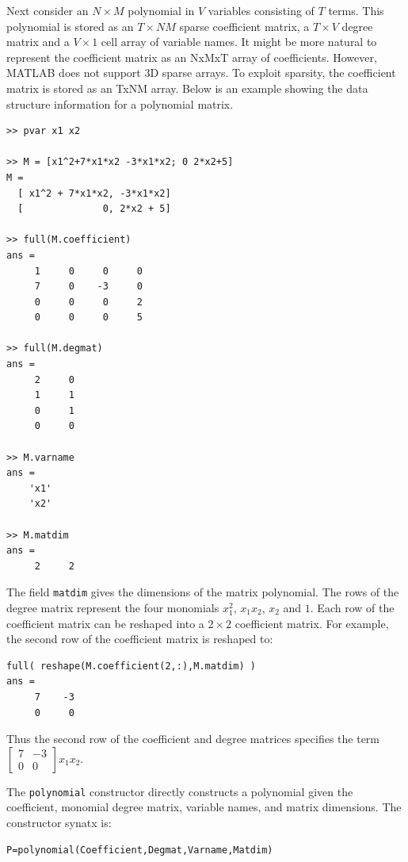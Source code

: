 \documentclass{article}
\newcommand{\bsmtx}{\left[ \begin{smallmatrix}}
\newcommand{\esmtx}{\end{smallmatrix} \right]}
\begin{document}
Next consider an $N\times M$ polynomial in $V$ variables consisting of
$T$ terms. This polynomial is stored as an $T\times NM$ sparse
coefficient matrix, a $T \times V$ degree matrix and a $V\times 1$
cell array of variable names. It might be more natural to represent
the coefficient matrix as an NxMxT array of coefficients. However,
MATLAB does not support 3D sparse arrays. To exploit sparsity, the
coefficient matrix is stored as an TxNM array. Below is an example
showing the data structure information for a polynomial matrix.

\begin{verbatim}
>> pvar x1 x2

>> M = [x1^2+7*x1*x2 -3*x1*x2; 0 2*x2+5]
M =
  [ x1^2 + 7*x1*x2, -3*x1*x2]
  [              0, 2*x2 + 5]

>> full(M.coefficient)
ans =
     1     0     0     0
     7     0    -3     0
     0     0     0     2
     0     0     0     5

>> full(M.degmat)
ans =
     2     0
     1     1
     0     1
     0     0

>> M.varname
ans =
    'x1'
    'x2'

>> M.matdim
ans =
     2     2
\end{verbatim}

The field \texttt{matdim} gives the dimensions of the matrix
polynomial. The rows of the degree matrix represent the four monomials
$x_1^2$, $x_1x_2$, $x_2$ and $1$. Each row of the coefficient matrix
can be reshaped into a $2\times 2$ coefficient matrix. For example,
the second row of the coefficient matrix is reshaped to:

\begin{verbatim}
full( reshape(M.coefficient(2,:),M.matdim) )
ans =
     7    -3
     0     0

\end{verbatim}

Thus the second row of the coefficient and degree matrices specifies
the term $\bsmtx 7 & -3 \\ 0 & 0 \esmtx x_1 x_2$.


The \texttt{polynomial} constructor directly constructs a polynomial
given the coefficient, monomial degree matrix, variable names, and
matrix dimensions.  The constructor synatx is:

\begin{verbatim}
P=polynomial(Coefficient,Degmat,Varname,Matdim)

\end{verbatim}
\end{document}
